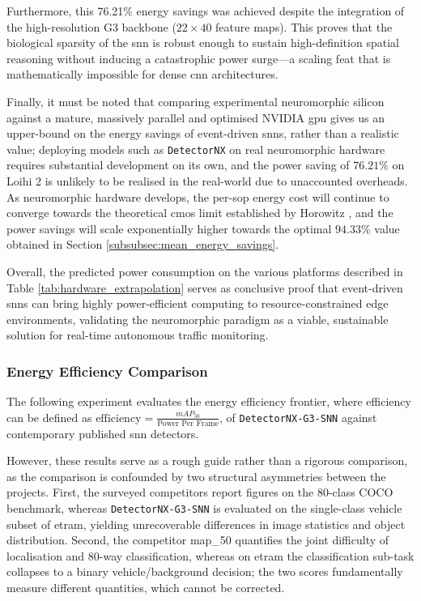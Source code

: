 Furthermore, this 76.21\% energy savings was achieved despite the integration of the high-resolution G3 backbone ($22 \times 40$ feature maps). This proves that the biological sparsity of the \gls{snn} is robust enough to sustain high-definition spatial reasoning without inducing a catastrophic power surge---a scaling feat that is mathematically impossible for dense \gls{cnn} architectures.

Finally, it must be noted that comparing experimental neuromorphic silicon against a mature, massively parallel and optimised NVIDIA \gls{gpu} gives us an upper-bound on the energy savings of event-driven \glspl{snn}, rather than a realistic value;
deploying models such as \texttt{DetectorNX} on real neuromorphic hardware requires substantial development on its own, and the power saving of $76.21\%$ on Loihi 2 is unlikely to be realised in the real-world due to unaccounted overheads.
As neuromorphic hardware develops, the per-\gls{sop} energy cost will continue to converge towards the theoretical \acrfull{cmos} limit established by Horowitz \cite{horowitz20141}, and the power savings will scale exponentially higher towards the optimal $94.33\%$ value obtained in Section \ref{subsubsec:mean_energy_savings}.

Overall, the predicted power consumption on the various platforms described in Table \ref{tab:hardware_extrapolation} serves as conclusive proof that event-driven \glspl{snn} can bring highly power-efficient computing to resource-constrained edge environments, validating the neuromorphic paradigm as a viable, sustainable solution for real-time autonomous traffic monitoring.

\subsubsection*{Energy Efficiency Comparison}
\label{subsec:efficiency_landscape}

The following experiment evaluates the energy efficiency frontier, where efficiency can be defined as $\text{efficiency} = \frac{mAP_{50}}{\text{Power Per Frame}}$,
of \texttt{DetectorNX-G3-SNN} against contemporary published \gls{snn} detectors.

However, these results serve as a rough guide rather than a rigorous comparison,
as the comparison is confounded by two structural asymmetries between the projects.
First, the surveyed competitors report figures on the 80-class COCO benchmark,
whereas \texttt{DetectorNX-G3-SNN} is evaluated on the single-class vehicle subset of \gls{etram}, 
yielding unrecoverable differences in image statistics and object distribution.
Second, the competitor \gls{map_50} quantifies the joint difficulty of localisation and 80-way classification,
whereas on \gls{etram} the classification sub-task collapses to a binary vehicle/background decision; the two scores fundamentally measure different quantities, which cannot be corrected.

